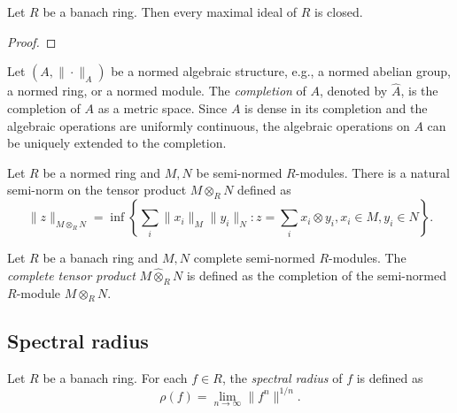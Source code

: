     \begin{corollary}\label{prop:maximal_ideal_of_banach_ring_is_closed}
        Let \(R\) be a banach ring.
        Then every maximal ideal of \(R\) is closed.
    \end{corollary}
    \begin{proof}
    \end{proof}

    \begin{definition}\label{def:completion_of_normed_algebraic_structures}
        Let \((A, \|\cdot\|_A)\) be a normed algebraic structure, e.g., a normed abelian group, a normed ring, or a normed module.
        The \emph{completion} of \(A\), denoted by \(\widehat{A}\), is the completion of \(A\) as a metric space.
        Since \(A\) is dense in its completion and the algebraic operations are uniformly continuous,
        the algebraic operations on \(A\) can be uniquely extended to the completion.
    \end{definition}
    
    Let \(R\) be a normed ring and \(M,N\) be semi-normed \(R\)-modules.
    There is a natural semi-norm on the tensor product \(M \otimes_R N\) defined as
    \[
        \|z\|_{M \otimes_R N} = \inf \left\{ \sum_{i} \|x_i\|_M \|y_i\|_N : z = \sum_i x_i \otimes y_i, x_i \in M, y_i \in N \right\}.
    \]

    \begin{definition}\label{def:complete_tensor_product}
        Let \(R\) be a banach ring and \(M,N\) complete semi-normed \(R\)-modules.
        The \emph{complete tensor product} \(M \widehat{\otimes}_R N\) is defined as the completion of the semi-normed \(R\)-module \(M \otimes_R N\).
    \end{definition}

    \begin{example}\label{eg:}
    \end{example}





\subsection{Spectral radius}

    \begin{definition}\label{def:spectral_radius_on_banach_rings}
        Let \(R\) be a banach ring.
        For each \(f \in R\), the \emph{spectral radius} of \(f\) is defined as
        \[
            \rho(f) = \lim_{n \to \infty} \|f^n\|^{1/n}.
        \]
    \end{definition}

